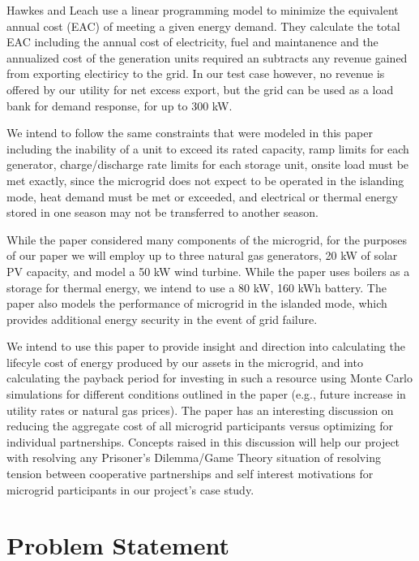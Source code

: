 \documentclass[a4paper]{article}
\begin{document}
Hawkes and Leach\cite{hawkes2009modelling} use a linear programming model to minimize the equivalent annual cost (EAC) of meeting a given energy demand. They calculate the total EAC including the annual cost of electricity, fuel and maintanence and the annualized cost of the generation units required an subtracts any revenue gained from exporting electiricy to the grid. In our test case however, no revenue is offered by our utility for net excess export, but the grid can be used as a load bank for demand response, for up to 300 kW.

We intend to follow the same constraints that were modeled in this paper including the inability of a unit to exceed its rated capacity, ramp limits for each generator, charge/discharge rate limits for each storage unit, onsite load must be met exactly, since the microgrid does not expect to be operated in the islanding mode, heat demand must be met or exceeded, and electrical or thermal energy stored in one season may not be transferred to another season. 

While the paper considered many components of the microgrid, for the purposes of our paper we will employ up to three natural gas generators, 20 kW of solar PV capacity, and model a 50 kW wind turbine. While the paper uses boilers as a storage for thermal energy, we intend to use a 80 kW, 160 kWh battery. The paper also models the performance of microgrid in the islanded mode, which provides additional energy security in the event of grid failure. 

We intend to use this paper to provide insight and direction into calculating the lifecyle cost of energy produced by our assets in the microgrid, and into calculating the payback period for investing in such a resource using Monte Carlo simulations for different conditions outlined in the paper (e.g., future increase in utility rates or natural gas prices). The paper has an interesting discussion on reducing the aggregate cost of all microgrid participants versus optimizing for individual partnerships. Concepts raised in this discussion will help our project with resolving any Prisoner's Dilemma/Game Theory situation of resolving tension between cooperative partnerships and self interest motivations for microgrid participants in our project's case study.

 
\section{Problem Statement}
\label{Problem Statement}
\end{document}
